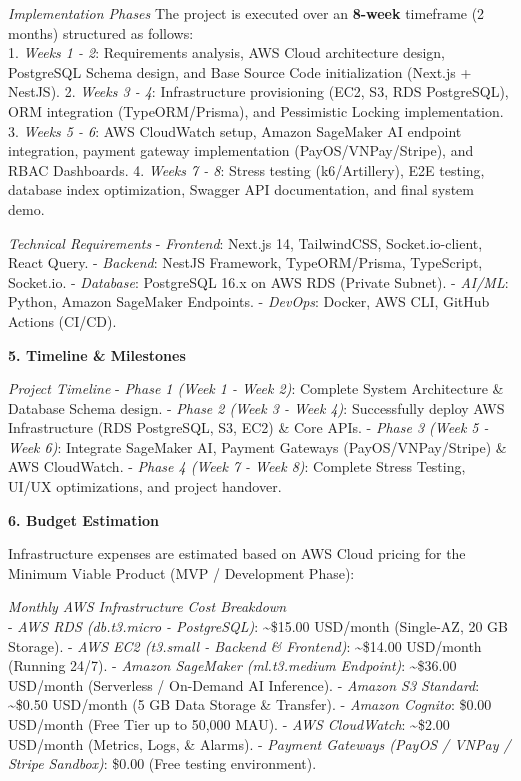 \emph{Implementation Phases} The project is executed over an
\textbf{8-week} timeframe (2 months) structured as follows:\\
1. \emph{Weeks 1 - 2}: Requirements analysis, AWS Cloud architecture
design, PostgreSQL Schema design, and Base Source Code initialization
(Next.js + NestJS). 2. \emph{Weeks 3 - 4}: Infrastructure provisioning
(EC2, S3, RDS PostgreSQL), ORM integration (TypeORM/Prisma), and
Pessimistic Locking implementation. 3. \emph{Weeks 5 - 6}: AWS
CloudWatch setup, Amazon SageMaker AI endpoint integration, payment
gateway implementation (PayOS/VNPay/Stripe), and RBAC Dashboards. 4.
\emph{Weeks 7 - 8}: Stress testing (k6/Artillery), E2E testing, database
index optimization, Swagger API documentation, and final system demo.

\emph{Technical Requirements} - \emph{Frontend}: Next.js 14,
TailwindCSS, Socket.io-client, React Query. - \emph{Backend}: NestJS
Framework, TypeORM/Prisma, TypeScript, Socket.io. - \emph{Database}:
PostgreSQL 16.x on AWS RDS (Private Subnet). - \emph{AI/ML}: Python,
Amazon SageMaker Endpoints. - \emph{DevOps}: Docker, AWS CLI, GitHub
Actions (CI/CD).

\vspace{0.5em}\noindent\textbf{5. Timeline \& Milestones}

\emph{Project Timeline} - \emph{Phase 1 (Week 1 - Week 2)}: Complete
System Architecture \& Database Schema design. - \emph{Phase 2 (Week 3 -
Week 4)}: Successfully deploy AWS Infrastructure (RDS PostgreSQL, S3,
EC2) \& Core APIs. - \emph{Phase 3 (Week 5 - Week 6)}: Integrate
SageMaker AI, Payment Gateways (PayOS/VNPay/Stripe) \& AWS CloudWatch. -
\emph{Phase 4 (Week 7 - Week 8)}: Complete Stress Testing, UI/UX
optimizations, and project handover.

\vspace{0.5em}\noindent\textbf{6. Budget Estimation}

Infrastructure expenses are estimated based on AWS Cloud pricing for the
Minimum Viable Product (MVP / Development Phase):

\emph{Monthly AWS Infrastructure Cost Breakdown}\\
- \emph{AWS RDS (db.t3.micro - PostgreSQL)}: \textasciitilde\$15.00
USD/month (Single-AZ, 20 GB Storage). - \emph{AWS EC2 (t3.small -
Backend \& Frontend)}: \textasciitilde\$14.00 USD/month (Running 24/7).
- \emph{Amazon SageMaker (ml.t3.medium Endpoint)}:
\textasciitilde\$36.00 USD/month (Serverless / On-Demand AI Inference).
- \emph{Amazon S3 Standard}: \textasciitilde\$0.50 USD/month (5 GB Data
Storage \& Transfer). - \emph{Amazon Cognito}: \$0.00 USD/month (Free
Tier up to 50,000 MAU). - \emph{AWS CloudWatch}: \textasciitilde\$2.00
USD/month (Metrics, Logs, \& Alarms). - \emph{Payment Gateways (PayOS /
VNPay / Stripe Sandbox)}: \$0.00 (Free testing environment).

